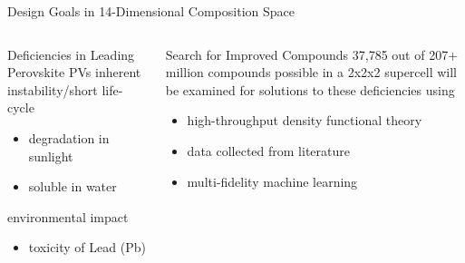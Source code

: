 \documentclass[10pt, aspectratio=169, presentation]{beamer}
\begin{document}
\begin{frame}[label={sec:orgc68b8e9}]{Design Goals in \alert{14-Dimensional} Composition Space}
\begin{columns}
\begin{column}{0.5\columnwidth}
\begin{block}{Deficiencies in Leading Perovskite PVs}
inherent instability/short life-cycle
\begin{itemize}
\item degradation in sunlight
\item soluble in water
\end{itemize}
environmental impact
\begin{itemize}
\item toxicity of Lead (Pb)
\end{itemize}
\end{block}

 
\begin{center}

\end{center}
\end{column}

\begin{column}{0.5\columnwidth}
 
\begin{center}

\end{center}

\begin{block}{Search for Improved Compounds}
\alert{37,785} out of \alert{207+ million} compounds possible in a 2x2x2 supercell
will be examined for solutions to these deficiencies using
\begin{itemize}
\item high-throughput density functional theory
\item data collected from literature
\item multi-fidelity machine learning
\end{itemize}
\end{block}
\end{column}
\end{columns}
\end{frame}
\end{document}
